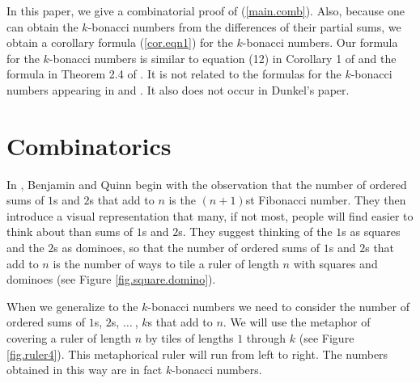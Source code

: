 \documentclass[11pt,reqno]{amsart}
\theoremstyle{plain}
\numberwithin{equation}{section}
\begin{document}
In this paper, we give a  combinatorial proof of (\ref{main.comb}). Also,
because one can obtain the $k$-bonacci numbers from the differences of their  partial sums, 
we  obtain a corollary formula  (\ref{cor.eqn1}) 
for the $k$-bonacci numbers.
Our formula for the $k$-bonacci numbers is similar to 
equation (12) in Corollary 1 of \cite{Kessler:2004:CPG} and 
the formula in Theorem 2.4 of \cite{Howard:2011:SIF}.
It is  not related to the formulas for the $k$-bonacci numbers appearing in \cite{Lee:2001:BFR} and   \cite{10.2307/2308649}. It also does not occur in Dunkel's paper.



\section{Combinatorics}\label{combinatorics}

In \cite{10.4169/j.ctt6wpwjh}, Benjamin and Quinn begin with the observation
that the number of ordered sums of $1$s and $2$s that add to $n$ is the 
$(n+1)$st Fibonacci number. They then introduce a visual representation
that many, if not most, people will find easier to think about than sums
of $1$s and $2$s. They suggest thinking of the $1$s as squares and the $2$s as 
dominoes, so that  the number of ordered sums of $1$s and $2$s that add to $n$
is the number of ways to tile a ruler of length $n$ with squares and 
dominoes (see Figure \ref{fig.square.domino}).

When we generalize to the 
$k$-bonacci numbers
we need to consider the number of ordered sums
of $1$s, $2$s, $\ldots\ $, $k$s that add to $n$.
We will use the metaphor of covering a ruler of length $n$ by tiles of lengths
$1$ through $k$  (see Figure \ref{fig.ruler4}).
This metaphorical ruler will run from left to right.
The numbers obtained in this way are in fact 
$k$-bonacci numbers.
\end{document}
